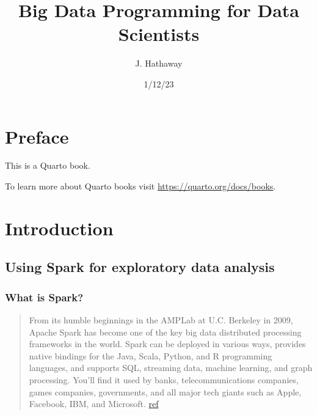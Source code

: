 \documentclass[
  letterpaper,
  DIV=11,
  numbers=noendperiod]{scrreprt}
\title{Big Data Programming for Data Scientists}
\author{J. Hathaway}
\date{1/12/23}
\renewcommand*\contentsname{Table of contents}
\newcommand\contentsname{Table of contents}
\begin{document}
\maketitle
\ifdefined\Shaded\renewenvironment{Shaded}{\begin{tcolorbox}[sharp corners, breakable, interior hidden, enhanced, borderline west={3pt}{0pt}{shadecolor}, frame hidden, boxrule=0pt]}{\end{tcolorbox}}\fi

\renewcommand*\contentsname{Table of contents}
{
\hypersetup{linkcolor=}
\setcounter{tocdepth}{2}
\tableofcontents
}

\hypertarget{preface}{%
\chapter*{Preface}\label{preface}}


This is a Quarto book.

To learn more about Quarto books visit
\url{https://quarto.org/docs/books}.


\hypertarget{introduction}{%
\chapter{Introduction}\label{introduction}}

\hypertarget{using-spark-for-exploratory-data-analysis}{%
\section{Using Spark for exploratory data
analysis}\label{using-spark-for-exploratory-data-analysis}}

\hypertarget{what-is-spark}{%
\subsection{What is Spark?}\label{what-is-spark}}

\begin{quote}
From its humble beginnings in the AMPLab at U.C. Berkeley in 2009,
Apache Spark has become one of the key big data distributed processing
frameworks in the world. Spark can be deployed in various ways, provides
native bindings for the Java, Scala, Python, and R programming
languages, and supports SQL, streaming data, machine learning, and graph
processing. You'll find it used by banks, telecommunications companies,
games companies, governments, and all major tech giants such as Apple,
Facebook, IBM, and Microsoft.
\href{https://www.infoworld.com/article/3236869/what-is-apache-spark-the-big-data-platform-that-crushed-hadoop.html}{ref}
\end{quote}
\end{document}

